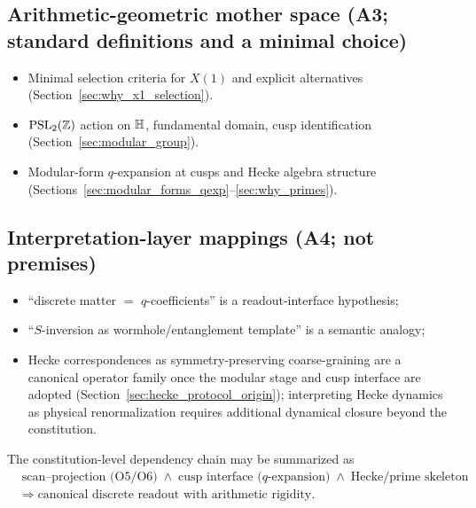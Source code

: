 \subsection{Arithmetic-geometric mother space (A3; standard definitions and a minimal choice)}
\label{app:a3}

\begin{itemize}
  \item Minimal selection criteria for $X(1)$ and explicit alternatives (Section~\ref{sec:why_x1_selection}).
  \item $\mathrm{PSL}_2(\mathbb{Z})$ action on $\mathbb{H}$, fundamental domain, cusp identification (Section~\ref{sec:modular_group}).
  \item Modular-form $q$-expansion at cusps and Hecke algebra structure (Sections~\ref{sec:modular_forms_qexp}--\ref{sec:why_primes}).
\end{itemize}

\subsection{Interpretation-layer mappings (A4; not premises)}
\label{app:a4}

\begin{itemize}
  \item ``discrete matter $=$ $q$-coefficients'' is a readout-interface hypothesis;
  \item ``$S$-inversion as wormhole/entanglement template'' is a semantic analogy;
  \item Hecke correspondences as symmetry-preserving coarse-graining are a canonical operator family once the modular stage and cusp interface are adopted (Section~\ref{sec:hecke_protocol_origin}); interpreting Hecke dynamics as physical renormalization requires additional dynamical closure beyond the constitution.
\end{itemize}

The constitution-level dependency chain may be summarized as
\begin{equation}
\begin{aligned}
&\text{scan--projection (O5/O6)}
\;\wedge\;
\text{cusp interface ($q$-expansion)}
\;\wedge\;
\text{Hecke/prime skeleton}
\\
&\Rightarrow\;\text{canonical discrete readout with arithmetic rigidity.}
\end{aligned}
\end{equation}


